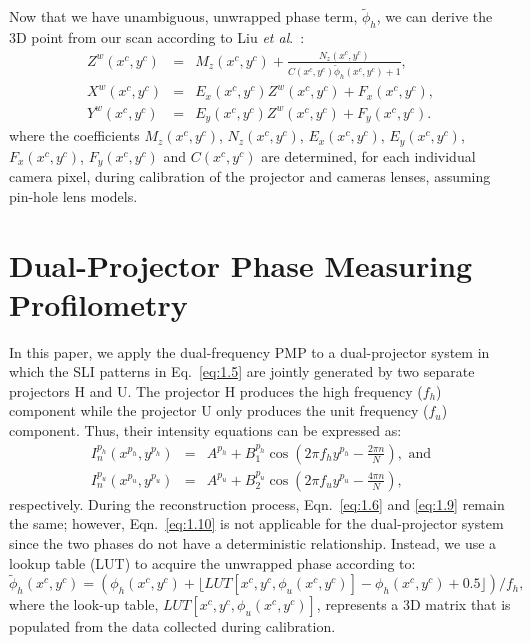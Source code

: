 \documentclass[]{spie}  %
\begin{document}
Now that we have unambiguous, unwrapped phase term, $\tilde{\phi}_h$, we can derive the 3D point from our scan according to Liu \textit{et al}.~\cite{liuk10}:
\begin{eqnarray}
Z^w(x^c, y^c) & = & M_z(x^c, y^c) + \frac{N_z(x^c, y^c)}{C(x^c, y^c) \tilde{\phi}_h(x^c, y^c) + 1}, \label{eq:1.11} \\
X^w(x^c, y^c) & = & E_x(x^c, y^c)Z^w(x^c, y^c) + F_x(x^c, y^c), \label{eq:1.12} \\
Y^w(x^c, y^c) & = & E_y(x^c, y^c)Z^w(x^c, y^c) + F_y(x^c, y^c). \label{eq:1.13}
\end{eqnarray}
where the coefficients $M_z(x^c, y^c)$, $N_z(x^c, y^c)$, $E_x(x^c, y^c)$, $E_y(x^c, y^c)$, $F_x(x^c, y^c)$, $F_y(x^c, y^c)$ and $C(x^c, y^c)$ are determined, for each individual camera pixel, during calibration of the projector and cameras lenses, assuming pin-hole lens models.

\section{Dual-Projector Phase Measuring Profilometry}
In this paper, we apply the dual-frequency PMP to a dual-projector system in which the SLI patterns in Eq.~\eqref{eq:1.5} are jointly generated by two separate projectors H and U. The projector H produces the high frequency ($f_h$) component while the projector U only produces the unit frequency ($f_u$) component. Thus, their intensity equations can be expressed as:
\begin{eqnarray}
I^{p_h}_n(x^{p_h}, y^{p_h}) & = & A^{p_h} + B^{p_h}_1\cos\left(2\pi f_h y^{p_h} - \frac{2\pi n}{N}\right),\mbox{ and}\label{eq:1.14}\\
I^{p_u}_n(x^{p_u}, y^{p_u}) & = & A^{p_u} + B^{p_u}_2\cos\left(2\pi f_u y^{p_u} - \frac{4\pi n}{N}\right),\label{eq:1.15}
\end{eqnarray}
respectively. During the reconstruction process, Eqn.~\eqref{eq:1.6} and \eqref{eq:1.9} remain the same; however, Eqn.~\eqref{eq:1.10} is not applicable for the dual-projector system since the two phases do not have a deterministic relationship.  Instead, we use a lookup table (LUT) to acquire the unwrapped phase according to:
\begin{equation} \label{eq:1.16}
\tilde{\phi}_h(x^c, y^c) = \left( \phi_h(x^c, y^c) + \lfloor LUT[x^c, y^c, \phi_u(x^c, y^c)] - \phi_h(x^c, y^c) + 0.5 \rfloor \right)/f_h,
\end{equation}
where the look-up table, $LUT[x^c, y^c, \phi_u(x^c, y^c)]$, represents a 3D matrix that is populated from the data collected during calibration.
\end{document}
